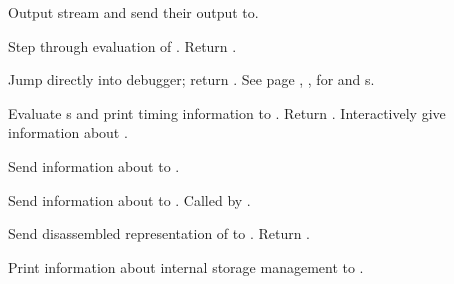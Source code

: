 \begin{LIST}{1cm}
  {
    Output stream  and  send their output to.
  }

  {
    Step through evaluation of . Return .
  }

  {
    Jump directly into debugger; return \retval{\NIL}.
    See page \pageref{section:Format}, , for 
    and s.
  }

  {
    Evaluate s and print timing information to
    . Return .
  }
  {
    Interactively give information about .
  }

  {
    Send information about  to .
  }

  {
    Send information about  to .  Called by
    .
  }

  {
    Send disassembled representation of  to
    . Return \retval{\NIL}.
  }

  {
    Print information about internal storage management to .
  }



\end{LIST}


